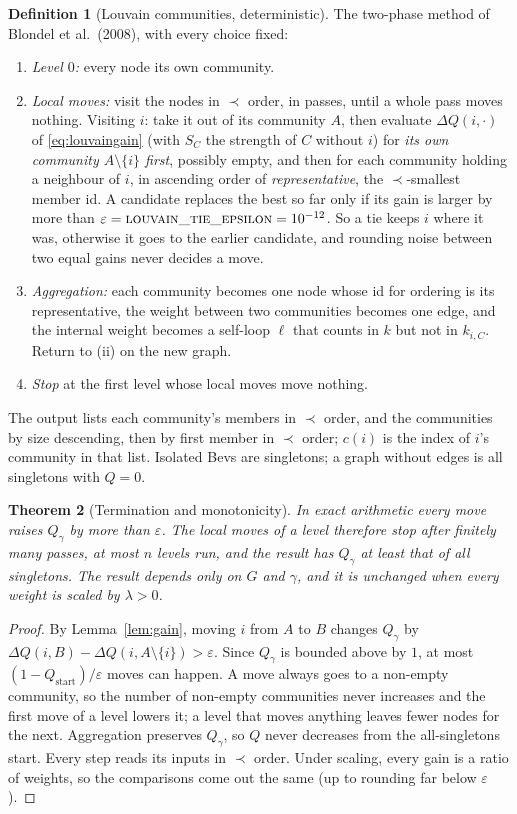 \documentclass[11pt]{article}
\theoremstyle{plain}
\newtheorem{theorem}{Theorem}[section]
\theoremstyle{definition}
\newtheorem{definition}[theorem]{Definition}
\theoremstyle{remark}
\begin{document}
\begin{definition}[Louvain communities, deterministic]\label{def:louvain}
The two-phase method of Blondel et al.\ (2008), with every choice fixed:
\begin{enumerate}[label=(\roman*)]
\item \emph{Level $0$:} every node its own community.
\item \emph{Local moves:} visit the nodes in $\prec$ order, in passes, until a whole pass moves nothing. Visiting $i$: take it out of its community $A$, then evaluate $\Delta Q(i, \cdot)$ of \eqref{eq:louvaingain} (with $S_C$ the strength of $C$ without $i$) for \emph{its own community $A \setminus \{i\}$ first}, possibly empty, and then for each community holding a neighbour of $i$, in ascending order of \emph{representative}, the $\prec$-smallest member id. A candidate replaces the best so far only if its gain is larger by more than $\varepsilon = \textsc{louvain\_tie\_epsilon} = 10^{-12}$. So a tie keeps $i$ where it was, otherwise it goes to the earlier candidate, and rounding noise between two equal gains never decides a move.
\item \emph{Aggregation:} each community becomes one node whose id for ordering is its representative, the weight between two communities becomes one edge, and the internal weight becomes a self-loop $\ell$ that counts in $k$ but not in $k_{i,C}$. Return to (ii) on the new graph.
\item \emph{Stop} at the first level whose local moves move nothing.
\end{enumerate}
The output lists each community's members in $\prec$ order, and the communities by size descending, then by first member in $\prec$ order; $c(i)$ is the index of $i$'s community in that list. Isolated Bevs are singletons; a graph without edges is all singletons with $Q = 0$.
\end{definition}

\begin{theorem}[Termination and monotonicity]\label{thm:louvain}
In exact arithmetic every move raises $Q_\gamma$ by more than $\varepsilon$. The local moves of a level therefore stop after finitely many passes, at most $n$ levels run, and the result has $Q_\gamma$ at least that of all singletons. The result depends only on $G$ and $\gamma$, and it is unchanged when every weight is scaled by $\lambda > 0$.
\end{theorem}
\begin{proof}
By Lemma~\ref{lem:gain}, moving $i$ from $A$ to $B$ changes $Q_\gamma$ by $\Delta Q(i, B) - \Delta Q(i, A \setminus \{i\}) > \varepsilon$. Since $Q_\gamma$ is bounded above by $1$, at most $(1 - Q_{\text{start}})/\varepsilon$ moves can happen. A move always goes to a non-empty community, so the number of non-empty communities never increases and the first move of a level lowers it; a level that moves anything leaves fewer nodes for the next. Aggregation preserves $Q_\gamma$, so $Q$ never decreases from the all-singletons start. Every step reads its inputs in $\prec$ order. Under scaling, every gain is a ratio of weights, so the comparisons come out the same (up to rounding far below $\varepsilon$).
\end{proof}
\end{document}
